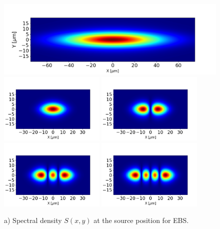 \documentclass{iucr}              %
\begin{document}
\begin{figure}\label{fig:spectraldensity}
    \centering
        \includegraphics[width=\textwidth]{GRAPHICS/ebs_spectral_density.png}
        \includegraphics[width=0.45\textwidth]{GRAPHICS/ebs_mode0.png}
        \includegraphics[width=0.45\textwidth]{GRAPHICS/ebs_mode1.png}
        \includegraphics[width=0.45\textwidth]{GRAPHICS/ebs_mode2.png}
        \includegraphics[width=0.45\textwidth]{GRAPHICS/ebs_mode3.png}
    \caption{a) Spectral density $S(x,y)$ at the source position for EBS.  }
\end{figure}
\end{document}
